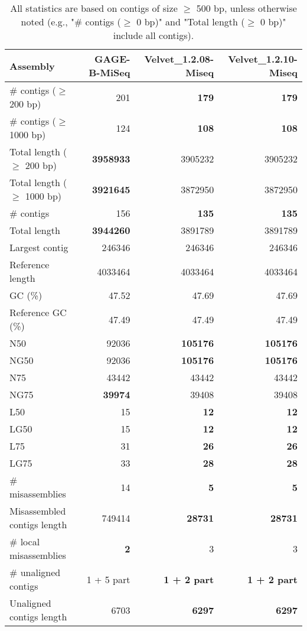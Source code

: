 \documentclass[12pt,a4paper]{article}
\begin{document}
\begin{table}[ht]
\begin{center}
\caption{All statistics are based on contigs of size $\geq$ 500 bp, unless otherwise noted (e.g., "\# contigs ($\geq$ 0 bp)" and "Total length ($\geq$ 0 bp)" include all contigs).}
\begin{tabular}{|l*{3}{|r}|}
\hline
Assembly & GAGE-B-MiSeq & Velvet\_1.2.08-Miseq & Velvet\_1.2.10-Miseq \\ \hline
\# contigs ($\geq$ 200 bp) & 201 & {\bf 179} & {\bf 179} \\ \hline
\# contigs ($\geq$ 1000 bp) & 124 & {\bf 108} & {\bf 108} \\ \hline
Total length ($\geq$ 200 bp) & {\bf 3958933} & 3905232 & 3905232 \\ \hline
Total length ($\geq$ 1000 bp) & {\bf 3921645} & 3872950 & 3872950 \\ \hline
\# contigs & 156 & {\bf 135} & {\bf 135} \\ \hline
Total length & {\bf 3944260} & 3891789 & 3891789 \\ \hline
Largest contig & 246346 & 246346 & 246346 \\ \hline
Reference length & 4033464 & 4033464 & 4033464 \\ \hline
GC (\%) & 47.52 & 47.69 & 47.69 \\ \hline
Reference GC (\%) & 47.49 & 47.49 & 47.49 \\ \hline
N50 & 92036 & {\bf 105176} & {\bf 105176} \\ \hline
NG50 & 92036 & {\bf 105176} & {\bf 105176} \\ \hline
N75 & 43442 & 43442 & 43442 \\ \hline
NG75 & {\bf 39974} & 39408 & 39408 \\ \hline
L50 & 15 & {\bf 12} & {\bf 12} \\ \hline
LG50 & 15 & {\bf 12} & {\bf 12} \\ \hline
L75 & 31 & {\bf 26} & {\bf 26} \\ \hline
LG75 & 33 & {\bf 28} & {\bf 28} \\ \hline
\# misassemblies & 14 & {\bf 5} & {\bf 5} \\ \hline
Misassembled contigs length & 749414 & {\bf 28731} & {\bf 28731} \\ \hline
\# local misassemblies & {\bf 2} & 3 & 3 \\ \hline
\# unaligned contigs & 1 + 5 part & {\bf 1 + 2 part} & {\bf 1 + 2 part} \\ \hline
Unaligned contigs length & 6703 & {\bf 6297} & {\bf 6297} \\ \hline

\end{tabular}
\end{center}
\end{table}
\end{document}
